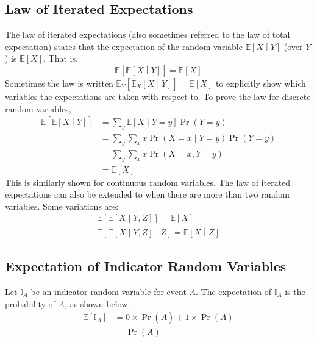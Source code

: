 \documentclass[11pt]{report} %
\begin{document}
\subsection{Law of Iterated Expectations}

The law of iterated expectations (also sometimes referred to the law of total expectation) states that the expectation of the random variable $\mathbb{E}\left[X\middle|Y\right]$ (over $Y$) is $\mathbb{E}\left[X\right]$. That is,
\begin{equation}
\mathbb{E}\left[\mathbb{E}\left[X\middle|Y\right]\right] = \mathbb{E}\left[X\right]
\end{equation}
Sometimes the law is written $\mathbb{E}_{Y}\left[\mathbb{E}_{X}\left[X\middle|Y\right]\right] = \mathbb{E}\left[X\right]$ to explicitly show which variables the expectations are taken with respect to. To prove the law for discrete random variables,
\begin{align}
\mathbb{E}\left[\mathbb{E}\left[X\middle|Y\right]\right] &= \sum_{y}\mathbb{E}\left[X\middle|Y = y\right]\operatorname{Pr}\left(Y = y\right) \\
&= \sum_{y}\sum_{x}x\operatorname{Pr}\left(X = x\middle|Y = y\right)\operatorname{Pr}\left(Y = y\right) \\
&= \sum_{y}\sum_{x}x\operatorname{Pr}\left(X = x, Y = y\right) \\
&= \mathbb{E}\left[X\right]
\end{align}
This is similarly shown for continuous random variables. The law of iterated expectations can also be extended to when there are more than two random variables. Some variations are:
\begin{gather}
\mathbb{E}\left[\mathbb{E}\left[X\middle|Y, Z\right]\right] = \mathbb{E}\left[X\right] \\
\mathbb{E}\left[\mathbb{E}\left[X\middle|Y, Z\right]\middle|Z\right] = \mathbb{E}\left[X\middle|Z\right]
\end{gather}

\subsection{Expectation of Indicator Random Variables}

Let $\mathbb{I}_{A}$ be an indicator random variable for event $A$. The expectation of $\mathbb{I}_{A}$ is the probability of $A$, as shown below.
\begin{align}
\mathbb{E}\left[\mathbb{I}_{A}\right] &= 0\times \operatorname{Pr}\left(\overline{A}\right) + 1\times \operatorname{Pr}\left(A\right) \\
&= \operatorname{Pr}\left(A\right)
\end{align}
\end{document}
